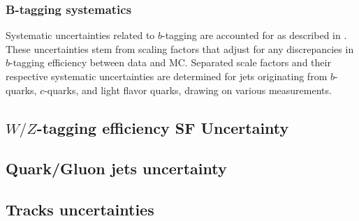 
\subsubsection*{B-tagging systematics}
Systematic uncertainties related to $b$-tagging are accounted for as described in \cite{BTagCalib}. 
These uncertainties stem from scaling factors that adjust for any discrepancies in $b$-tagging efficiency between data and MC. 
Separated scale factors and their respective systematic uncertainties are determined for jets originating from $b$-quarks, $c$-quarks, and light flavor quarks, drawing on various measurements.

 
\subsection{$W/Z$-tagging efficiency SF Uncertainty}


\subsection{Quark/Gluon jets uncertainty}


\subsection{Tracks uncertainties}


